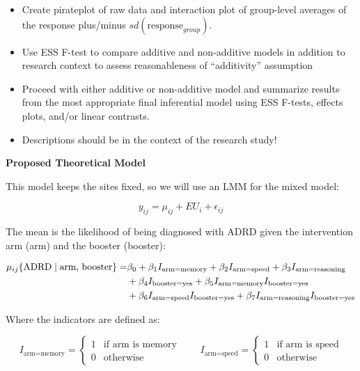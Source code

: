 \documentclass[11pt]{article}
\begin{document}
\begin{itemize}
\item Create pirateplot of raw data and interaction plot of group-level averages of the response plus/minus \(sd(\text{response}_{group})\).
\item Use ESS F-test to compare additive and non-additive models in addition to research context to assess reasonableness of “additivity” assumption
\item Proceed with either additive or non-additive model and summarize results from the most appropriate final inferential model using ESS F-tests, effects plots, and/or linear contrasts.
\item Descriptions should be in the context of the research study!
\end{itemize}

\textbf{\textbf{Proposed Theoretical Model}}

This model keeps the sites fixed, so we will use an LMM for the mixed model:

\begin{equation}
y_{ij} = \mu_{ij} + EU_i + \epsilon_{ij}
\end{equation}

The mean is the likelihood of being diagnosed with ADRD given the intervention arm (arm) and the booster (booster):

\begin{align}
\mu_{ij} \{ \text{ADRD} \mid \text{arm, booster} \} = &\beta_0 + \beta_1 I_{\text{arm=memory}} + \beta_2 I_{\text{arm=speed}} + \beta_3 I_{\text{arm=reasoning}} \notag \\
&+ \beta_4 I_{\text{booster=yes}} + \beta_5 I_{\text{arm=memory}} I_{\text{booster=yes}} \notag \\
&+ \beta_6 I_{\text{arm=speed}} I_{\text{booster=yes}} + \beta_7 I_{\text{arm=reasoning}} I_{\text{booster=yes}}
\end{align}

Where the indicators are defined as:

\begin{equation}
I_{\text{arm=memory}} =
\begin{cases}
1 & \text{if arm is memory} \\
0 & \text{otherwise}
\end{cases}
\qquad
I_{\text{arm=speed}} =
\begin{cases}
1 & \text{if arm is speed} \\
0 & \text{otherwise}
\end{cases}
\end{equation}
\end{document}
